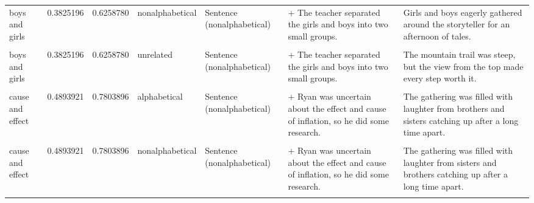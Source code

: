 \documentclass[
  12pt,
]{scrartcl}
\begin{document}
\begin{landscape}
\begin{longtable}{lrrllll}
\addlinespace
boys and girls & 0.3825196 & 0.6258780 & nonalphabetical & Sentence (nonalphabetical) & + The teacher separated the girls and boys into two small groups. & Girls and boys eagerly gathered around the storyteller for an afternoon of tales.\\
\cellcolor{gray!6}{boys and girls} & \cellcolor{gray!6}{0.3825196} & \cellcolor{gray!6}{0.6258780} & \cellcolor{gray!6}{unrelated} & \cellcolor{gray!6}{Sentence (alphabetical)} & \cellcolor{gray!6}{+ The teacher separated the boys and girls into two small groups.} & \cellcolor{gray!6}{The mountain trail was steep, but the view from the top made every step worth it.}\\
boys and girls & 0.3825196 & 0.6258780 & unrelated & Sentence (nonalphabetical) & + The teacher separated the girls and boys into two small groups. & The mountain trail was steep, but the view from the top made every step worth it.\\
\cellcolor{gray!6}{cause and effect} & \cellcolor{gray!6}{0.4893921} & \cellcolor{gray!6}{0.7803896} & \cellcolor{gray!6}{alphabetical} & \cellcolor{gray!6}{Sentence (alphabetical)} & \cellcolor{gray!6}{+ Ryan was uncertain about the cause and effect of inflation, so he did some research.} & \cellcolor{gray!6}{The gathering was filled with laughter from brothers and sisters catching up after a long time apart.}\\
cause and effect & 0.4893921 & 0.7803896 & alphabetical & Sentence (nonalphabetical) & + Ryan was uncertain about the effect and cause of inflation, so he did some research. & The gathering was filled with laughter from brothers and sisters catching up after a long time apart.\\
\addlinespace
\cellcolor{gray!6}{cause and effect} & \cellcolor{gray!6}{0.4893921} & \cellcolor{gray!6}{0.7803896} & \cellcolor{gray!6}{nonalphabetical} & \cellcolor{gray!6}{Sentence (alphabetical)} & \cellcolor{gray!6}{+ Ryan was uncertain about the cause and effect of inflation, so he did some research.} & \cellcolor{gray!6}{The gathering was filled with laughter from sisters and brothers catching up after a long time apart.}\\
cause and effect & 0.4893921 & 0.7803896 & nonalphabetical & Sentence (nonalphabetical) & + Ryan was uncertain about the effect and cause of inflation, so he did some research. & The gathering was filled with laughter from sisters and brothers catching up after a long time apart.\\
\cellcolor{gray!6}{cause and effect} & \cellcolor{gray!6}{0.4893921} & \cellcolor{gray!6}{0.7803896} & \cellcolor{gray!6}{unrelated} & \cellcolor{gray!6}{Sentence (alphabetical)} & \cellcolor{gray!6}{+ Ryan was uncertain about the cause and effect of inflation, so he did some research.} & \cellcolor{gray!6}{She carefully wrapped the gift, tying a red ribbon into a perfect bow.}\\

\end{longtable}
\end{landscape}
\end{document}
